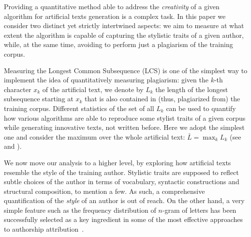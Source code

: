 \documentclass[journal]{IEEEtran}
\begin{document}
Providing a quantitative method able to address the {\it creativity} of a given algorithm for artificial texts generation is a complex task. In this paper we consider two distinct yet strictly intertwined aspects: we aim to measure at what extent the algorithm is capable of capturing the stylistic traits of a given author, while, at the same time, avoiding to perform just a plagiarism of the training corpus.

Measuring the Longest Common Subsequence (LCS) is one of the simplest way to implement the idea of quantitatively measuring plagiarism: given the $k$-th character $x_k$ of the artificial text, we denote by $L_k$ the length of the longest subsequence starting at $x_k$ that is also contained in (thus, plagiarized from) the training corpus.
%
Different statistics of the set of all $L_k$ can be used to quantify how various algorithms are able to reproduce some stylist traits of a given corpus while generating innovative texts, not written before. Here we adopt the simplest one and consider the maximum over the whole artificial text: $\bar{L}=\max_k L_k$ (see~\cite{Papadopoulos2016} and \cite{Pachet2018}).

We now move our analysis to a higher level, by exploring how artificial texts resemble the style of the training author. Stylistic traits are supposed to reflect subtle choices of the author in terms of vocabulary, syntactic constructions and structural composition, to mention a few. As such, a comprehensive quantification of the \emph{style} of an author is out of reach. On the other hand, a very simple feature such as the frequency distribution of $n$-gram of letters has been successfully selected as a key ingredient in some of the most effective approaches to authorship attribution~\cite{Basile2008,Benedetto2013}.
\end{document}
